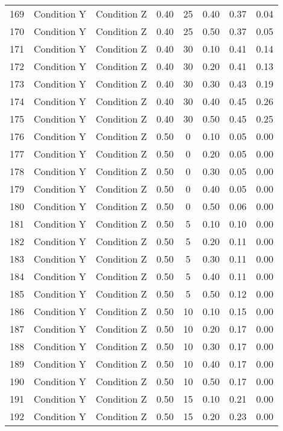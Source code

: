 \begin{landscape}
\begin{longtable}{cc cc cc cc}
  169 & Condition Y & Condition Z & 0.40 &  25 & 0.40 & 0.37 & 0.04 \\ 
  170 & Condition Y & Condition Z & 0.40 &  25 & 0.50 & 0.37 & 0.05 \\ 
  171 & Condition Y & Condition Z & 0.40 &  30 & 0.10 & 0.41 & 0.14 \\ 
  172 & Condition Y & Condition Z & 0.40 &  30 & 0.20 & 0.41 & 0.13 \\ 
  173 & Condition Y & Condition Z & 0.40 &  30 & 0.30 & 0.43 & 0.19 \\ 
  174 & Condition Y & Condition Z & 0.40 &  30 & 0.40 & 0.45 & 0.26 \\ 
  175 & Condition Y & Condition Z & 0.40 &  30 & 0.50 & 0.45 & 0.25 \\ 
  176 & Condition Y & Condition Z & 0.50 &   0 & 0.10 & 0.05 & 0.00 \\ 
  177 & Condition Y & Condition Z & 0.50 &   0 & 0.20 & 0.05 & 0.00 \\ 
  178 & Condition Y & Condition Z & 0.50 &   0 & 0.30 & 0.05 & 0.00 \\ 
  179 & Condition Y & Condition Z & 0.50 &   0 & 0.40 & 0.05 & 0.00 \\ 
  180 & Condition Y & Condition Z & 0.50 &   0 & 0.50 & 0.06 & 0.00 \\ 
  181 & Condition Y & Condition Z & 0.50 &   5 & 0.10 & 0.10 & 0.00 \\ 
  182 & Condition Y & Condition Z & 0.50 &   5 & 0.20 & 0.11 & 0.00 \\ 
  183 & Condition Y & Condition Z & 0.50 &   5 & 0.30 & 0.11 & 0.00 \\ 
  184 & Condition Y & Condition Z & 0.50 &   5 & 0.40 & 0.11 & 0.00 \\ 
  185 & Condition Y & Condition Z & 0.50 &   5 & 0.50 & 0.12 & 0.00 \\ 
  186 & Condition Y & Condition Z & 0.50 &  10 & 0.10 & 0.15 & 0.00 \\ 
  187 & Condition Y & Condition Z & 0.50 &  10 & 0.20 & 0.17 & 0.00 \\ 
  188 & Condition Y & Condition Z & 0.50 &  10 & 0.30 & 0.17 & 0.00 \\ 
  189 & Condition Y & Condition Z & 0.50 &  10 & 0.40 & 0.17 & 0.00 \\ 
  190 & Condition Y & Condition Z & 0.50 &  10 & 0.50 & 0.17 & 0.00 \\ 
  191 & Condition Y & Condition Z & 0.50 &  15 & 0.10 & 0.21 & 0.00 \\ 
  192 & Condition Y & Condition Z & 0.50 &  15 & 0.20 & 0.23 & 0.00 \\ 

\end{longtable}
\end{landscape}
